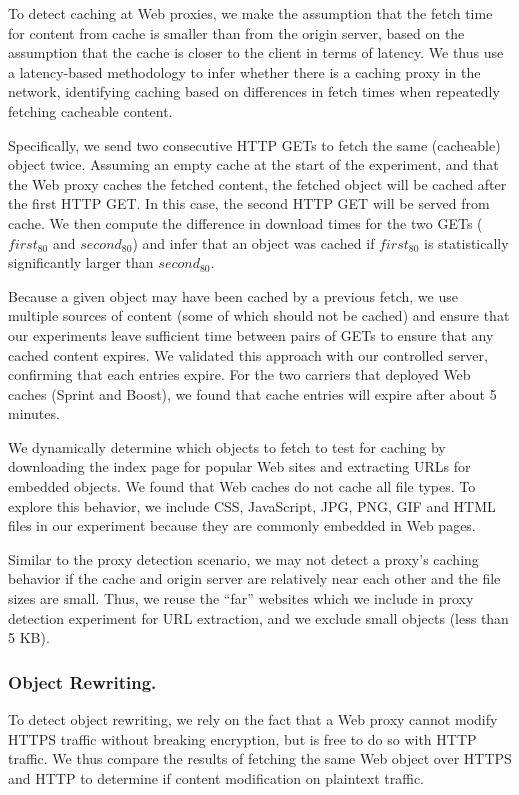 To detect caching at Web proxies, we make the assumption that the fetch time for content from cache is smaller than from the origin server, based on the assumption that the cache is closer to the client in terms of latency. We thus use a latency-based methodology to infer whether there is a caching proxy in the network, identifying caching based on differences in fetch times when repeatedly fetching cacheable content. 

Specifically, we send two consecutive HTTP GETs to fetch the same (cacheable) object twice. Assuming an empty cache at the start of the experiment, and that the Web proxy caches the fetched content, the fetched object will be cached after the first HTTP GET. In this case, the second HTTP GET will be served from cache. We then compute the difference in download times for the two GETs ($first_{80}$ and $second_{80}$) and infer that an object was cached if $first_{80}$ is statistically significantly larger than $second_{80}$. 

Because a given object may have been cached by a previous fetch, we use multiple sources of content (some of which should not be cached) and ensure that our experiments leave sufficient time between pairs of GETs to ensure that any cached content expires.  We validated this approach with our controlled server, confirming that each entries expire. For the two carriers that deployed Web caches (Sprint and Boost), we found that cache entries will expire after about 5 minutes.


We dynamically determine which objects to fetch to test for caching by downloading the index page for popular Web sites and extracting URLs for embedded objects. 
We found that Web caches do not cache all file types. To explore this behavior, we include CSS, JavaScript, JPG, PNG, GIF and HTML files in our experiment because they are commonly embedded in Web pages.


Similar to the proxy detection scenario, we may not detect a proxy's caching behavior if the cache and origin server are relatively near each other and the file sizes are small. Thus, we reuse the ``far'' websites which we include in proxy detection experiment for URL extraction, and we exclude small objects (less than 5 KB).


\vspace{-1em}
\subsubsection{Object Rewriting.}
To detect object rewriting, we rely on the fact that a Web proxy cannot modify HTTPS traffic without breaking encryption, but is free to do so with HTTP traffic. We thus compare the results of fetching the same Web object over HTTPS and HTTP to determine if content modification on plaintext traffic. 

